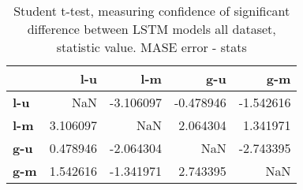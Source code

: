 \begin{table}[h]
\centering
\caption{Student t-test, measuring confidence of significant difference between LSTM models all dataset, statistic value. MASE error - stats}
\label{table:ttest-stats-lstm-experiments-MASE-all-datasets}
\begin{tabular}{lrrrr}
\toprule
{} &       l-u &       l-m &       g-u &       g-m \\
\midrule
\textbf{l-u} &       NaN & -3.106097 & -0.478946 & -1.542616 \\
\textbf{l-m} &  3.106097 &       NaN &  2.064304 &  1.341971 \\
\textbf{g-u} &  0.478946 & -2.064304 &       NaN & -2.743395 \\
\textbf{g-m} &  1.542616 & -1.341971 &  2.743395 &       NaN \\
\bottomrule
\end{tabular}
\end{table}
